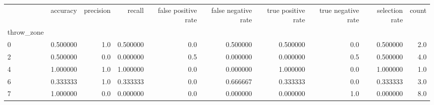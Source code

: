 \begin{tabular}{lrrrrrrrrr}
\toprule
{} &  accuracy &  precision &    recall &  false positive rate &  false negative rate &  true positive rate &  true negative rate &  selection rate &  count \\
throw\_zone &           &            &           &                      &                      &                     &                     &                 &        \\
\midrule
0          &  0.500000 &        1.0 &  0.500000 &                  0.0 &             0.500000 &            0.500000 &                 0.0 &        0.500000 &    2.0 \\
2          &  0.500000 &        0.0 &  0.000000 &                  0.5 &             0.000000 &            0.000000 &                 0.5 &        0.500000 &    4.0 \\
4          &  1.000000 &        1.0 &  1.000000 &                  0.0 &             0.000000 &            1.000000 &                 0.0 &        1.000000 &    1.0 \\
6          &  0.333333 &        1.0 &  0.333333 &                  0.0 &             0.666667 &            0.333333 &                 0.0 &        0.333333 &    3.0 \\
7          &  1.000000 &        0.0 &  0.000000 &                  0.0 &             0.000000 &            0.000000 &                 1.0 &        0.000000 &    8.0 \\
\bottomrule
\end{tabular}
